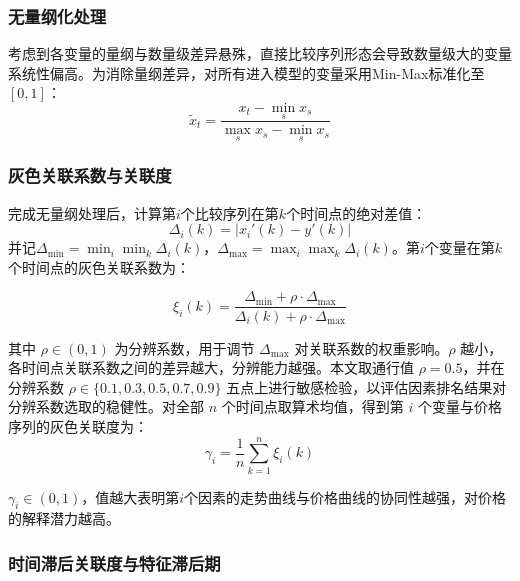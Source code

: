 \documentclass[a4paper,12pt,fontset=fandol]{ctexart}
\begin{document}
\subsubsection{无量纲化处理}

考虑到各变量的量纲与数量级差异悬殊，直接比较序列形态会导致数量级大的变量系统性偏高。为消除量纲差异，对所有进入模型的变量采用Min-Max标准化至$[0,1]$：
\begin{equation}
\tilde{x}_t = \frac{x_t - \min_s x_s}{\max_s x_s - \min_s x_s}
\end{equation}

\subsubsection{灰色关联系数与关联度}

完成无量纲处理后，计算第$i$个比较序列在第$k$个时间点的绝对差值：
\begin{equation}
\Delta_i(k) = |x_i'(k) - y'(k)|
\end{equation}
并记$\Delta_{\min}=\min_i\min_k\Delta_i(k)$，$\Delta_{\max}=\max_i\max_k\Delta_i(k)$。第$i$个变量在第$k$个时间点的灰色关联系数为：

\begin{equation}
  \xi_i(k) = \frac{\Delta_{\min} + \rho \cdot \Delta_{\max}}
          {\Delta_i(k) + \rho \cdot \Delta_{\max}}
    \label{eq:xi}
\end{equation}
 
其中 $\rho\in(0,1)$ 为分辨系数，用于调节 $\Delta_{\max}$ 对关联系数的权重影响。$\rho$ 越小，各时间点关联系数之间的差异越大，分辨能力越强。本文取通行值 $\rho = 0.5$，并在分辨系数 $\rho \in \{0.1, 0.3, 0.5, 0.7, 0.9\}$ 五点上进行敏感检验，以评估因素排名结果对分辨系数选取的稳健性。对全部 $n$ 个时间点取算术均值，得到第 $i$ 个变量与价格序列的灰色关联度为：
\begin{equation}
\gamma_i = \frac{1}{n}\sum_{k=1}^{n}\xi_i(k)
\end{equation}

$\gamma_i\in(0,1)$，值越大表明第$i$个因素的走势曲线与价格曲线的协同性越强，对价格的解释潜力越高。

\subsubsection{时间滞后关联度与特征滞后期}
\end{document}
